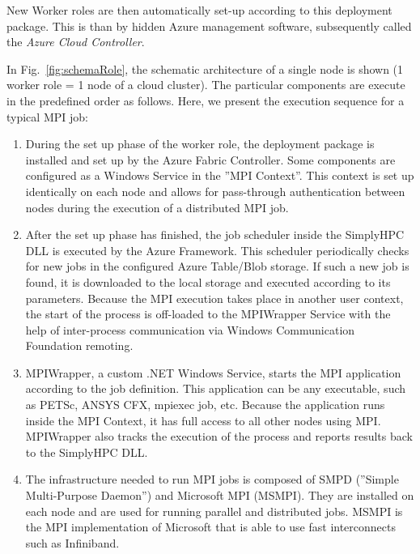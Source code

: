 \documentclass[3p,times]{elsarticle}
\begin{document}
New Worker roles are then automatically set-up according to this deployment package. This is than by hidden Azure management software, subsequently called the \textit{Azure Cloud Controller}. 


In Fig.~\ref{fig:schemaRole}, the schematic architecture of a single node is shown (1 worker role = 1 node of a cloud cluster). The particular components are execute in the predefined order as follows. Here, we present the execution sequence for a typical MPI job:

\begin{enumerate}
	\item During the set up phase of the worker role, the deployment package is installed and set up by the Azure Fabric Controller. Some components are configured as a Windows Service in the ''MPI Context''. This context is set up identically on each node and allows for pass-through authentication between nodes during the execution of a distributed MPI job.

	\item After the set up phase has finished, the job scheduler inside the SimplyHPC DLL is executed by the Azure Framework. This scheduler periodically checks for new jobs in the configured Azure Table/Blob storage. If such a new job is found, it is downloaded to the local storage and executed according to its parameters. Because the MPI execution takes place in another user context, the start of the process is off-loaded to the MPIWrapper Service with the help of inter-process communication via Windows Communication Foundation remoting.

	\item MPIWrapper, a custom .NET Windows Service, starts the MPI application according to the job definition. This application can be any executable, such as PETSc, ANSYS CFX, mpiexec job, etc. Because the application runs inside the MPI Context, it has full access to all other nodes using MPI. MPIWrapper also tracks the execution of the process and reports results back to the SimplyHPC DLL.

	\item The infrastructure needed to run MPI jobs is composed of SMPD (''Simple Multi-Purpose Daemon'') and Microsoft MPI (MSMPI). They are installed on each node and are used for running parallel and distributed jobs. MSMPI is the MPI implementation of Microsoft that is able to use fast interconnects such as Infiniband.
\end{enumerate}
\end{document}
